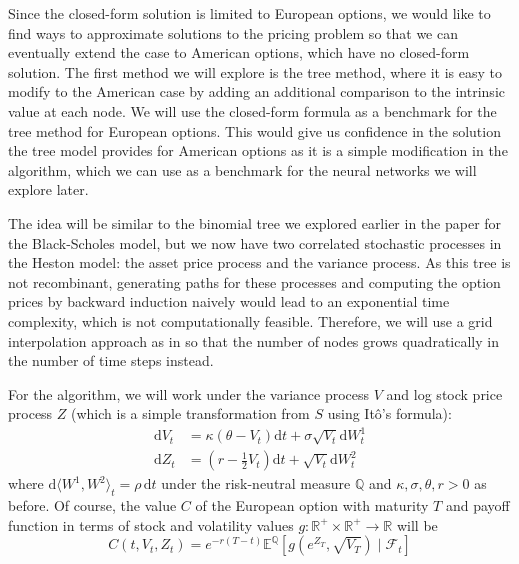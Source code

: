 Since the closed-form solution is limited to European options, we would like to find ways to approximate solutions to the pricing problem so that we can eventually extend the case to American options, which have no closed-form solution. The first method we will explore is the tree method, where it is easy to modify to the American case by adding an additional comparison to the intrinsic value at each node. We will use the closed-form formula as a benchmark for the tree method for European options. This would give us confidence in the solution the tree model provides for American options as it is a simple modification in the algorithm, which we can use as a benchmark for the neural networks we will explore later.

The idea will be similar to the binomial tree we explored earlier in the paper for the Black-Scholes model, but we now have two correlated stochastic processes in the Heston model: the asset price process and the variance process. As this tree is not recombinant, generating paths for these processes and computing the option prices by backward induction naively would lead to an exponential time complexity, which is not computationally feasible. Therefore, we will use a grid interpolation approach as in \cite{vellekoop2009tree} so that the number of nodes grows quadratically in the number of time steps instead.

For the algorithm, we will work under the variance process $V$ and log stock price process $Z$ (which is a simple transformation from $S$ using Itô's formula):
\begin{align}
    \mathrm dV_t &= \kappa(\theta - V_t)\mathrm dt + \sigma \sqrt{V_t} \mathrm dW_t^1 \\
    \mathrm d Z_t &= (r-\tfrac 12 V_t)\mathrm dt + \sqrt {V_t} \mathrm dW_t^2
\end{align}
where $\mathrm d\langle W^1, W^2\rangle_t = \rho \,\mathrm dt$ under the risk-neutral measure $\mathbb Q$ and $\kappa, \sigma, \theta, r > 0$ as before. Of course, the value $C$ of the European option with maturity $T$ and payoff function in terms of stock and volatility values $g:\mathbb R^+ \times \mathbb R^+ \to \mathbb R$ will be
\begin{equation}
    C(t, V_t, Z_t) = e^{-r(T-t)}\mathbb E^\mathbb Q [g(e^{Z_T}, \sqrt {V_T})\mid \mathcal F_t]
\end{equation}

